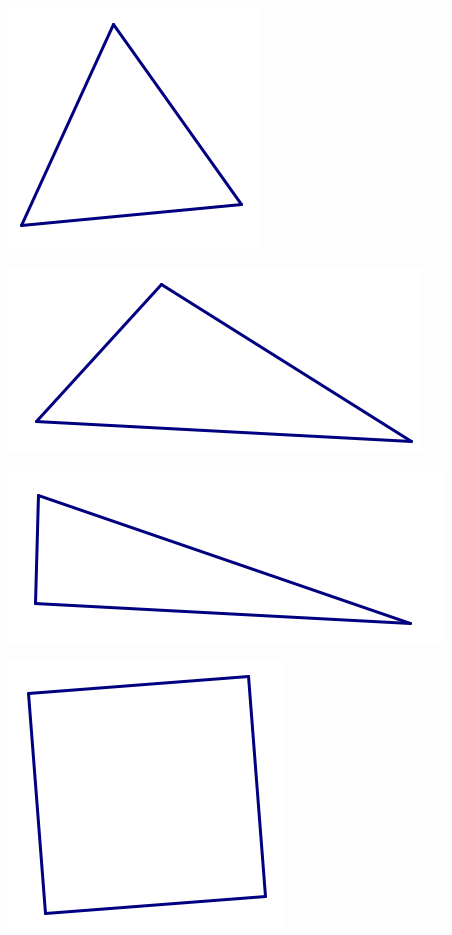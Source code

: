 \documentclass[12pt, reqno]{amsart}
\theoremstyle{remark}
\theoremstyle{definition}
\numberwithin{equation}{section}  %
\begin{document}
\begin{center}
\includegraphics[scale=0.95]{eqtri}

\includegraphics[scale=0.95]{scalenetri1}

\includegraphics[scale=0.95]{scalenetri2}

\includegraphics[scale=0.85]{square3}


\end{center}
\end{document}
